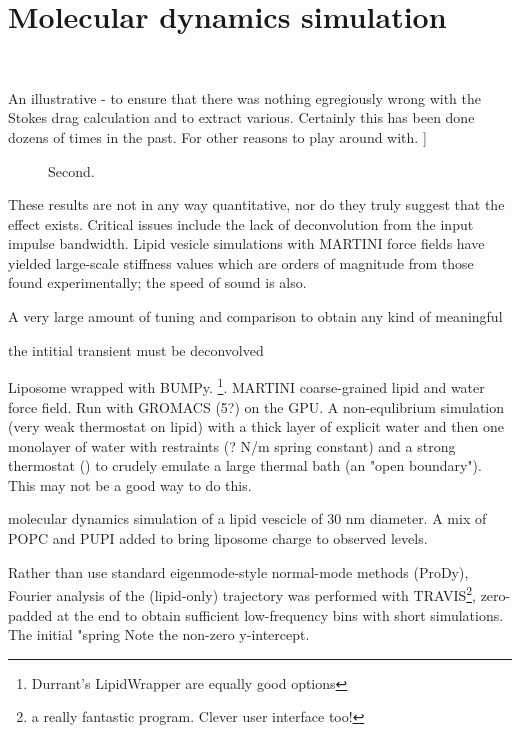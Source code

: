 \documentclass[paper.tex]{subfiles}
\begin{document}
\section{Molecular dynamics simulation}
\


An illustrative - to ensure that there was nothing egregiously wrong with the Stokes drag calculation and to extract various. Certainly this has been done dozens of times in the past. For other reasons to play around with. ]\

\begin{figure}[H]
	\centering
	\hfill
		\caption{Second.}
		
\end{figure}

These results are not in any way quantitative, nor do they truly suggest that the effect exists. Critical issues include the lack of deconvolution from the input impulse bandwidth. Lipid vesicle simulations with MARTINI force fields have yielded large-scale stiffness values which are orders of magnitude\cite{Determining2014} from those found experimentally; the speed of sound is also. 

A very large amount of tuning and comparison  to obtain any kind of meaningful  

the intitial transient must be deconvolved

Liposome wrapped with BUMPy\cite{BUMPy2018}. \footnote{Durrant's LipidWrapper are equally good options}. MARTINI 
coarse-grained 
lipid and water force field. Run with GROMACS (5?) on the GPU. A non-equlibrium simulation (very weak thermostat on lipid) with a thick layer of explicit water and then one monolayer of water with restraints (? N/m spring constant) and a strong thermostat () to crudely emulate a large thermal bath (an "open boundary"). This may not be a good way to do this.

molecular dynamics simulation of a lipid vescicle of 30 nm diameter. A mix of POPC and PUPI added to bring liposome charge to 
observed levels.

Rather than use standard eigenmode-style normal-mode methods (ProDy), Fourier analysis of the (lipid-only) trajectory was performed with TRAVIS\footnote{a really fantastic program. Clever user interface too!}, zero-padded at the end to obtain sufficient low-frequency bins with short simulations. The initial "spring Note the non-zero y-intercept. 
\end{document}
